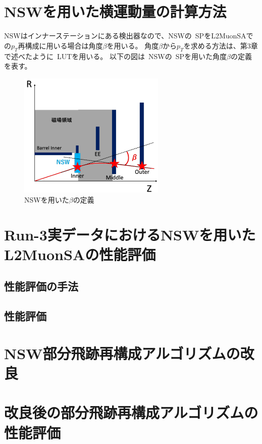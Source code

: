 \section{NSWを用いた横運動量の計算方法}\label{5-2}
NSWはインナーステーションにある検出器なので、NSWの~SPをL2MuonSAでの$p_T$再構成に用いる場合は角度$\beta$を用いる。
角度$\beta$から$p_T$を求める方法は、第3章で述べたように~LUTを用いる。
以下の図は~NSWの~SPを用いた角度$\beta$の定義を表す。
\begin{figure}[h]
    \centering
    \includegraphics[clip, width=7cm]{fig/5/NSW_beta.png}
    \caption{NSWを用いた$\beta$の定義}
    \label{fig:enter-label}
\end{figure}

\section{Run-3実データにおけるNSWを用いたL2MuonSAの性能評価}\label{5-3}

\subsection{性能評価の手法}
\subsection{性能評価}

\section{NSW部分飛跡再構成アルゴリズムの改良}\label{5-4}

\section{改良後の部分飛跡再構成アルゴリズムの性能評価}\label{5-5}